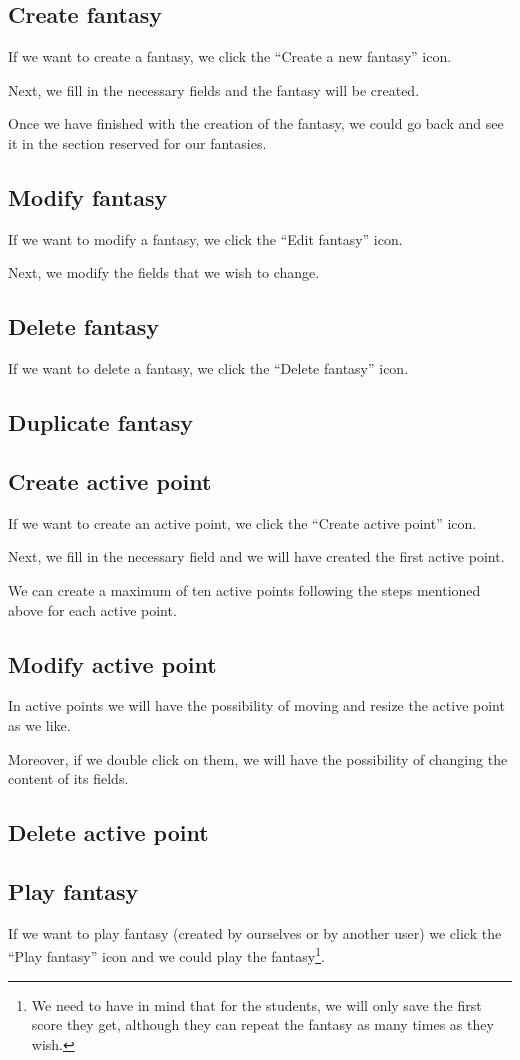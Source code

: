 \subsection{Create fantasy}
If we want to create a fantasy, we click the ``Create a new fantasy'' icon.

Next, we fill in the necessary fields and the fantasy will be created.

Once we have finished with the creation of the fantasy, we could go back and see it in the section reserved for our fantasies.

\subsection{Modify fantasy}
If we want to modify a fantasy, we click the ``Edit fantasy'' icon.

Next, we modify the fields that we wish to change.

\subsection{Delete fantasy}
If we want to delete a fantasy, we click the ``Delete fantasy'' icon.

\subsection{Duplicate fantasy}

\subsection{Create active point}
If we want to create an active point, we click the ``Create active point'' icon.

Next, we fill in the necessary field and we will have created the first active point.

We can create a maximum of ten active points following the steps mentioned above for each active point.

\subsection{Modify active point}
In active points we will have the possibility of moving and resize the active point as we like.

Moreover, if we double click on them, we will have the possibility of changing the content of its fields.

\subsection{Delete active point}

\subsection{Play fantasy}
If we want to play fantasy (created by ourselves or by another user) we click the ``Play fantasy'' icon and we could play the fantasy\footnote{We need to have in mind that for the students, we will only save the first score they get, although they can repeat the fantasy as many times as they wish.}.